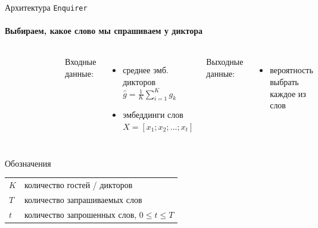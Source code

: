\documentclass[aspectratio=43]{beamer}
\newcommand{\enquirer}{\texttt{Enquirer}}
\begin{document}
\begin{frame}{Архитектура \enquirer}
\framesubtitle{Выбираем, какое слово мы спрашиваем у диктора}
    \begin{columns}

    \begin{figure}[bht]
    \includegraphics[width=.9\textwidth]{enquirer.png}
    \end{figure}

    Входные данные:
    \begin{itemize}
        \item среднее эмб. дикторов\\
            $\hat{g} = \frac{1}{K}{\sum_{i=1}^{K}{g_k}}$
        \item эмбеддинги слов\\
            $X = [x_1; x_2; \ldots; x_t]$
    \end{itemize}
    Выходные данные:
    \begin{itemize}
        \item вероятность выбрать каждое из слов
    \end{itemize}

    \end{columns}

    \begin{block}{Обозначения}
    \begin{tabular}{l l}
        $K$ & количество гостей / дикторов\\
        $T$ & количество запрашиваемых слов\\
        $t$ & количество запрошенных слов, $0 \leq t \leq T$
    \end{tabular}
    \end{block}
\end{frame}
\end{document}
